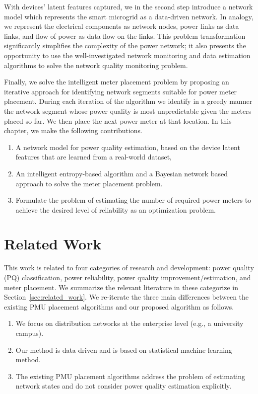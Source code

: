 With devices' latent features captured, we in the second step introduce a network model which represents the smart microgrid as a data-driven network. In analogy, we represent the electrical components as network nodes, power links as data links, and flow of power as data flow on the links. This problem transformation significantly simplifies the complexity of the power network; it also presents the opportunity to use the well-investigated network monitoring and data estimation algorithms to solve the network quality monitoring problem.

Finally, we solve the intelligent meter placement problem by proposing an iterative approach for identifying network segments suitable for power meter placement. During each iteration of the algorithm we identify in a greedy manner the network segment whose power quality is most unpredictable given the meters placed so far. We then place the next power meter at that location. In this chapter, we make the following contributions. 
\begin{enumerate}
	\item A network model for power quality estimation, based on the device latent features that are learned from a real-world dataset, 
	\item An intelligent entropy-based algorithm and a Bayesian network based approach to solve the meter placement problem.
	\item Formulate the problem of estimating the number of required power meters to achieve the desired level of reliability as an optimization problem.
\end{enumerate}

\section{Related Work}
This work is related to four categories of research and development: power quality (PQ) classification, power reliability, power quality improvement/estimation, and meter placement. We summarize the relevant literature in these categorize in Section~\ref{sec:related_work}. We re-iterate the three main differences between the existing PMU placement algorithms and our proposed algorithm as follows.

\begin{enumerate}
\item We focus on distribution networks at the enterprise level (e.g., a university campus).
\item Our method is data driven and is based on statistical machine learning method.
\item The existing PMU placement algorithms address the problem of estimating network states and do not consider power quality estimation explicitly.
\end{enumerate}

